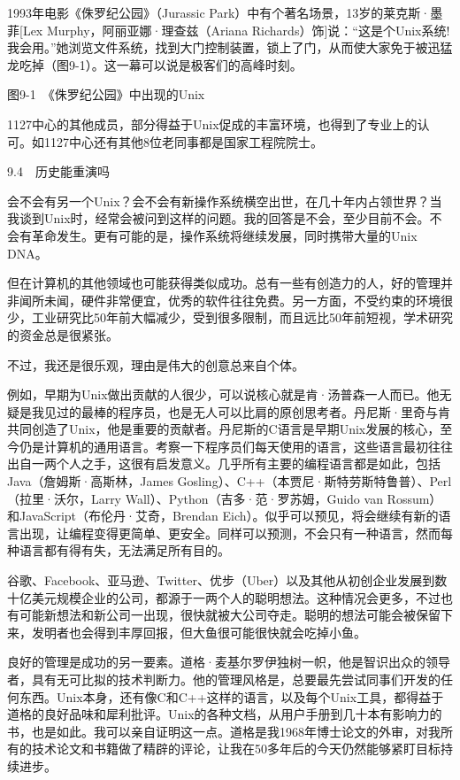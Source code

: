 \documentclass[a4paper,12pt,UTF8,twoside]{ctexbook}
\begin{document}
1993年电影《侏罗纪公园》（Jurassic Park）中有个著名场景，13岁的莱克斯·墨菲[Lex Murphy，阿丽亚娜·理查兹（Ariana Richards）饰]说：“这是个Unix系统! 我会用。”她浏览文件系统，找到大门控制装置，锁上了门，从而使大家免于被迅猛龙吃掉（图9-1）。这一幕可以说是极客们的高峰时刻。



图9-1　《侏罗纪公园》中出现的Unix

1127中心的其他成员，部分得益于Unix促成的丰富环境，也得到了专业上的认可。如1127中心还有其他8位老同事都是国家工程院院士。





9.4　历史能重演吗


会不会有另一个Unix？会不会有新操作系统横空出世，在几十年内占领世界？当我谈到Unix时，经常会被问到这样的问题。我的回答是不会，至少目前不会。不会有革命发生。更有可能的是，操作系统将继续发展，同时携带大量的Unix DNA。

但在计算机的其他领域也可能获得类似成功。总有一些有创造力的人，好的管理并非闻所未闻，硬件非常便宜，优秀的软件往往免费。另一方面，不受约束的环境很少，工业研究比50年前大幅减少，受到很多限制，而且远比50年前短视，学术研究的资金总是很紧张。

不过，我还是很乐观，理由是伟大的创意总来自个体。

例如，早期为Unix做出贡献的人很少，可以说核心就是肯·汤普森一人而已。他无疑是我见过的最棒的程序员，也是无人可以比肩的原创思考者。丹尼斯·里奇与肯共同创造了Unix，他是重要的贡献者。丹尼斯的C语言是早期Unix发展的核心，至今仍是计算机的通用语言。考察一下程序员们每天使用的语言，这些语言最初往往出自一两个人之手，这很有启发意义。几乎所有主要的编程语言都是如此，包括Java（詹姆斯·高斯林，James Gosling）、C++（本贾尼·斯特劳斯特鲁普）、Perl（拉里·沃尔，Larry Wall）、Python（吉多·范·罗苏姆，Guido van Rossum）和JavaScript（布伦丹·艾奇，Brendan Eich）。似乎可以预见，将会继续有新的语言出现，让编程变得更简单、更安全。同样可以预测，不会只有一种语言，然而每种语言都有得有失，无法满足所有目的。

谷歌、Facebook、亚马逊、Twitter、优步（Uber）以及其他从初创企业发展到数十亿美元规模企业的公司，都源于一两个人的聪明想法。这种情况会更多，不过也有可能新想法和新公司一出现，很快就被大公司夺走。聪明的想法可能会被保留下来，发明者也会得到丰厚回报，但大鱼很可能很快就会吃掉小鱼。

良好的管理是成功的另一要素。道格·麦基尔罗伊独树一帜，他是智识出众的领导者，具有无可比拟的技术判断力。他的管理风格是，总要最先尝试同事们开发的任何东西。Unix本身，还有像C和C++这样的语言，以及每个Unix工具，都得益于道格的良好品味和犀利批评。Unix的各种文档，从用户手册到几十本有影响力的书，也是如此。我可以亲自证明这一点。道格是我1968年博士论文的外审，对我所有的技术论文和书籍做了精辟的评论，让我在50多年后的今天仍然能够紧盯目标持续进步。
\end{document}
